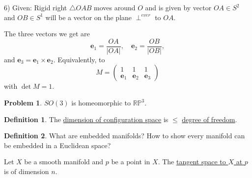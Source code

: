 \documentclass[11pt]{article}
\theoremstyle{definition}
\newtheorem{definition}{Definition}[section]
\newtheorem{problem}{Problem}
\theoremstyle{remark}
\begin{document}
6)
Given: Rigid right \(\triangle OAB\) moves around \(O\) and is given by vector \(OA \in S^2\) and \(OB \in S^1\) will be a vector on the plane \(\perp^{ever}\) to \(OA\).

\begin{center}
\end{center}

The three vectors we get are
\[
\mathbf{e}_1 = \frac{OA}{|OA|}, \quad \mathbf{e}_2 = \frac{OB}{|OB|},
\]
and $\mathbf{e}_3 = \mathbf{e}_1 \times \mathbf{e}_2$. Equivalently, to
\[
M = \begin{pmatrix}
1 & 1 & 1 \\
\mathbf{e}_1 & \mathbf{e}_2 & \mathbf{e}_3
\end{pmatrix}
\]
with $\det M = 1$.

\begin{problem}
$SO(3)$ is homeomorphic to $\mathbb{RP}^3$.
\end{problem}

\begin{definition}\label{def:degree_of_freedom}
The \underline{dimension of configuration space} is $\leq$ \underline{degree of freedom}.
\end{definition}

\begin{definition}\label{def:embedded_manifold}
What are embedded manifolds? How to show every manifold can be embedded in a Euclidean space?
\end{definition}

Let $X$ be a smooth manifold and $p$ be a point in $X$. The \underline{tangent space to $X$ at $p$} is of dimension $n$.
\end{document}
